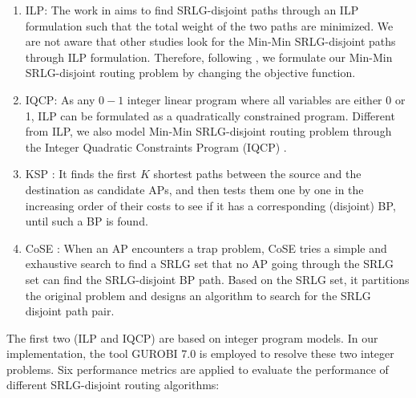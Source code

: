 \begin{enumerate}
  \item ILP: The work in \cite{hu2003diverse}  aims to find SRLG-disjoint paths through an ILP formulation such that the total weight of the two paths are minimized. We are not aware that other studies look for the Min-Min SRLG-disjoint paths through ILP formulation. Therefore, following \cite{hu2003diverse}, we formulate  our Min-Min SRLG-disjoint routing problem by changing the objective function.
  \item IQCP: As any $0-1$ integer linear program where all variables are either 0 or 1,  ILP can be formulated as a quadratically constrained program. Different from ILP, we also model Min-Min SRLG-disjoint routing problem through the Integer Quadratic Constraints Program (IQCP) \cite{hu2003diverse}.
  \item KSP \cite{eppstein1998finding}: It finds the first $K$ shortest paths between the source and the destination as candidate APs, and then tests them one by one in the increasing order of their costs to see if it has a corresponding (disjoint) BP, until such a BP is found.
  \item CoSE \cite{rostami2007cose}: When an AP encounters a trap problem, CoSE tries a simple and exhaustive search to find a SRLG set that no AP going through the SRLG set can find the SRLG-disjoint BP path. Based on the SRLG set, it partitions the original problem  and designs an algorithm to search for the SRLG disjoint path pair.
\end{enumerate}
The first two (ILP and IQCP) are based on integer program models. In our implementation, the tool GUROBI 7.0 \cite{optimization2012gurobi} is employed to resolve these two integer problems.  Six performance metrics are applied to evaluate the performance of different SRLG-disjoint routing algorithms:
